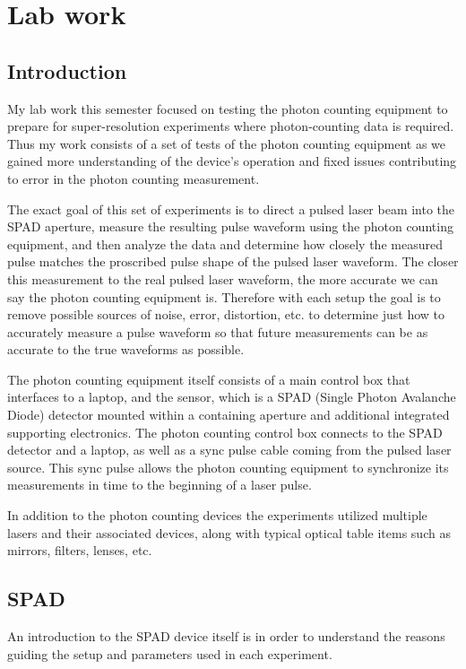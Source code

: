 \documentclass[a4paper]{article}
\begin{document}
\section{Lab work}

\subsection{Introduction}

My lab work this semester focused on testing the photon counting equipment to prepare for super-resolution experiments where photon-counting data is required. Thus my work consists of a set of tests of the photon counting equipment as we gained more understanding of the device's operation and fixed issues contributing to error in the photon counting measurement.

The exact goal of this set of experiments is to direct a pulsed laser beam into the SPAD aperture, measure the resulting pulse waveform using the photon counting equipment, and then analyze the data and determine how closely the measured pulse matches the proscribed pulse shape of the pulsed laser waveform. The closer this measurement to the real pulsed laser waveform, the more accurate we can say the photon counting equipment is. Therefore with each setup the goal is to remove possible sources of noise, error, distortion, etc. to determine just how to accurately measure a pulse waveform so that future measurements can be as accurate to the true waveforms as possible.

The photon counting equipment itself consists of a main control box that interfaces to a laptop, and the sensor, which is a SPAD (Single Photon Avalanche Diode) detector mounted within a containing aperture and additional integrated supporting electronics. The photon counting control box connects to the SPAD detector and a laptop, as well as a sync pulse cable coming from the pulsed laser source. This sync pulse allows the photon counting equipment to synchronize its measurements in time to the beginning of a laser pulse.

In addition to the photon counting devices the experiments utilized multiple lasers and their associated devices, along with typical optical table items such as mirrors, filters, lenses, etc.

\subsection{SPAD}

An introduction to the SPAD device itself is in order to understand the reasons guiding the setup and parameters used in each experiment.
\end{document}
